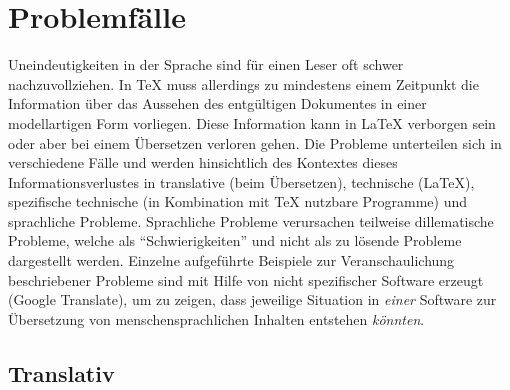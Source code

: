 
\section{Problemfälle}
Uneindeutigkeiten\label{probleme:uneindeutigkeiten} in der Sprache sind für einen Leser oft schwer nachzuvollziehen. In \TeX{} muss allerdings zu mindestens einem Zeitpunkt die Information über das Aussehen des entgültigen Dokumentes in einer modellartigen Form vorliegen. Diese Information kann in \LaTeX{} verborgen sein oder aber bei einem Übersetzen verloren gehen.
Die Probleme unterteilen sich in verschiedene Fälle und werden hinsichtlich des Kontextes dieses Informationsverlustes in translative (beim Übersetzen), technische (\LaTeX{}), spezifische technische (in Kombination mit \TeX{} nutzbare Programme) und sprachliche Probleme. Sprachliche Probleme verursachen teilweise dillematische Probleme,%
welche als \enquote{Schwierigkeiten} und nicht als zu lösende Probleme dargestellt werden. Einzelne aufgeführte Beispiele zur Veranschaulichung beschriebener Probleme sind mit Hilfe von nicht spezifischer Software erzeugt (Google Translate), um zu zeigen, dass jeweilige Situation in \textit{einer} Software zur Übersetzung von menschensprachlichen Inhalten entstehen \textit{könnten}.



\subsection{Translativ}\label{problems:simple}

